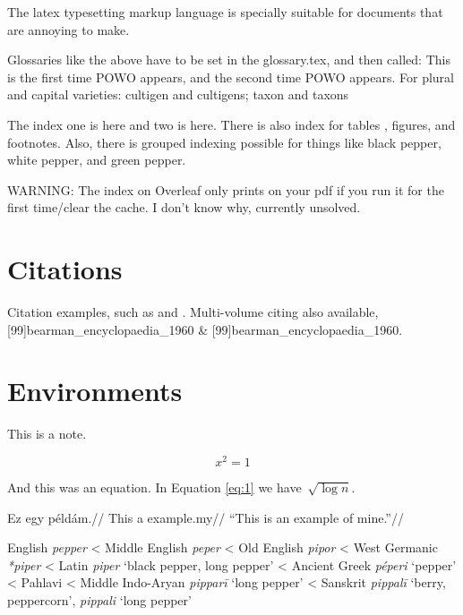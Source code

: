 The \gls{latex} typesetting markup language is specially suitable 
for documents that are annoying to make.

Glossaries like the above have to be set in the glossary.tex, and then called:
This is the first time \gls{POWO} appears, and the second time \gls{POWO} appears. For plural and capital varieties:
\gls{cultigen} and \glspl{cultigen}; \Gls{taxon} and \Glspl{taxon}

\bigskip

The index one is here and two is here. There is also index for tables , figures, and footnotes.
Also, there is grouped indexing possible for things like black pepper, white pepper, and green pepper. 

WARNING: The index on Overleaf only prints on your pdf if you run it for the first time/clear the cache. I don't know why, currently unsolved.

\section{Citations}

Citation examples, such as \autocite[99]{huang_routledge_2019} and \textcite{huang_routledge_2019}. 
Multi-volume citing also available, [99]{bearman_encyclopaedia_1960} \& [99]{bearman_encyclopaedia_1960}.

\section{Environments}

\begin{note}
    This is a note.
\end{note}

\begin{equation}
    \label{eq:1}
    x^2  = 1
\end{equation}

And this was an equation. In Equation \ref{eq:1} we have~$\sqrt{\log n}$.

\ex
\begingl
\gla{}Ez egy példám.//
\glb This a example.my//
\glft ``This is an example of mine.''//
\endgl
\xe




\begin{etymology}\label{etym:pepper}
\raggedright
English \textit{pepper}
< Middle English \textit{peper}
< Old English \textit{pipor}
< West Germanic \textit{*piper}
< Latin \textit{piper} `black pepper, long pepper'
< Ancient Greek \textit{péperi} `pepper'
< Pahlavi
< Middle Indo-Aryan \textit{pipparī} `long pepper'
< Sanskrit \textit{pippalī} `berry, peppercorn', \textit{pippali} `long pepper'
\end{etymology}

